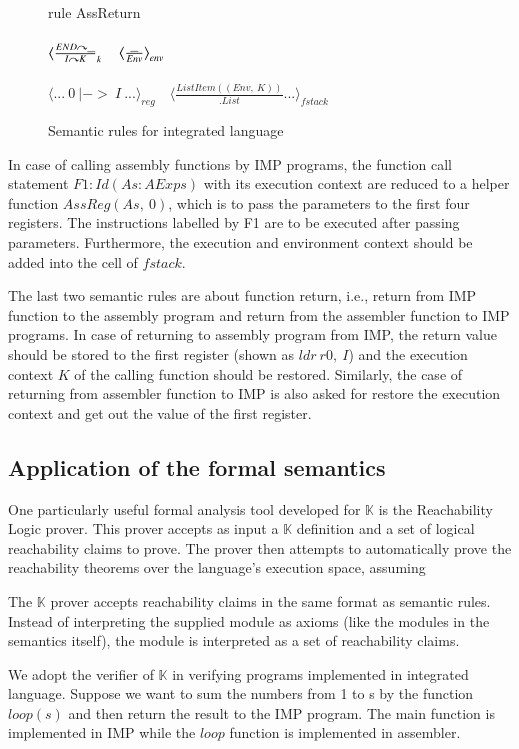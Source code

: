 \documentclass[letterpaper, 10 pt, conference]{IEEEtran}
\begin{document}
\begin{figure}
rule AssReturn\\ \\
$\big\langle\frac{END\curvearrowright \underline{\hbox to 2mm{}}}{I\curvearrowright K}_{k}$
$~~~\big\langle\frac{\underline{\hbox to 2mm{}}}{Env}\big\rangle_{env}$\\ \\
$\big\langle ...~0~|->~I~...\big\rangle_{reg}$
$~~~\big\langle\frac{ListItem((Env,~K))}{.List} ...\big\rangle_{fstack}$


  \caption{Semantic rules for integrated language}
  \label{semantics}
\end{figure}
\par In case of calling assembly functions by IMP programs, the function call statement $F1:Id(As:AExps)$ with its execution context are reduced to a helper function $AssReg(As,~0)$, which is to pass the parameters to the first four registers. The instructions labelled by F1 are to be executed after  passing parameters. Furthermore, the execution and environment context should be added into the cell of $fstack$.
\par The last two semantic rules are about function return, i.e., return from IMP function to the assembly program and return from the assembler function to IMP programs. In case of returning to assembly program from IMP, the return value should be stored to the first register (shown as $ldr~r0,~I$) and the execution context $K$ of the calling function should be restored. Similarly, the case of returning from assembler function to IMP is also asked for restore the execution context and get out the value of the first register.

\subsection{Application of the formal semantics}
\par One particularly useful formal analysis tool developed for $\mathbb{K}$ is the Reachability Logic prover. This prover
accepts as input a $\mathbb{K}$ definition and a set of logical reachability claims to prove. The prover then attempts
to automatically prove the reachability theorems over the language's execution space, assuming
\par The $\mathbb{K}$ prover accepts reachability claims in the same format as semantic rules.
Instead of interpreting the supplied module as axioms (like the modules in the semantics itself), the module is interpreted as a set of reachability claims.
\par We adopt the verifier of $\mathbb{K}$ in verifying programs implemented in integrated language. Suppose we want to sum the numbers from 1 to s by the function $loop(s)$ and then return the result to the IMP program. The main function is implemented in IMP while the $loop$ function is implemented in assembler.
\end{document}
